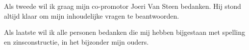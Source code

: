 \documentclass[pdftex,a4paper,12pt,twoside]{report}
\begin{document}
Als tweede wil ik graag mijn co-promotor Joeri Van Steen bedanken. Hij stond altijd klaar om mijn inhoudelijke vragen te beantwoorden. 

Als laatste wil ik alle personen bedanken die mij hebben bijgestaan met spelling en zinsconstructie, in het bijzonder mijn ouders.



\tableofcontents


%
\end{document}

